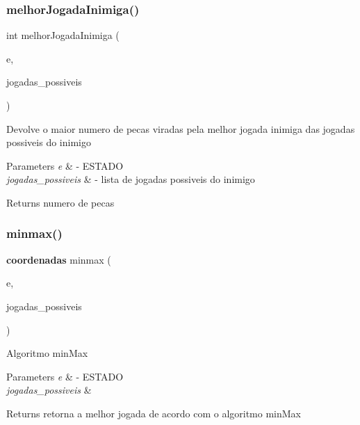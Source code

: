 \subsubsection{melhorJogadaInimiga()}
{\footnotesize\ttfamily int melhor\+Jogada\+Inimiga (\begin{DoxyParamCaption}\item[{\textbf{ E\+S\+T\+A\+DO} $\ast$}]{e,  }\item[{\textbf{ Ltpl}}]{jogadas\+\_\+possiveis }\end{DoxyParamCaption})}

Devolve o maior numero de pecas viradas pela melhor jogada inimiga das jogadas possiveis do inimigo 
\begin{DoxyParams}{Parameters}
{\em e} & -\/ E\+S\+T\+A\+DO \\
\hline
{\em jogadas\+\_\+possiveis} & -\/ lista de jogadas possiveis do inimigo \\
\hline
\end{DoxyParams}
\begin{DoxyReturn}{Returns}
numero de pecas 
\end{DoxyReturn}
\mbox{\label{jogar_8h_ab25688a909d41ff23a6ef3456fed07d6}} 
\subsubsection{minmax()}
{\footnotesize\ttfamily \textbf{ coordenadas} minmax (\begin{DoxyParamCaption}\item[{\textbf{ E\+S\+T\+A\+DO} $\ast$}]{e,  }\item[{\textbf{ Ltpl}}]{jogadas\+\_\+possiveis }\end{DoxyParamCaption})}

Algoritmo min\+Max 
\begin{DoxyParams}{Parameters}
{\em e} & -\/ E\+S\+T\+A\+DO \\
\hline
{\em jogadas\+\_\+possiveis} & \\
\hline
\end{DoxyParams}
\begin{DoxyReturn}{Returns}
retorna a melhor jogada de acordo com o algoritmo min\+Max 
\end{DoxyReturn}
\mbox{\label{jogar_8h_ab0919de328bd38b8e48880c028041a8a}} 
